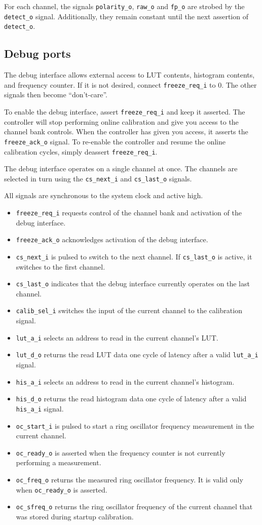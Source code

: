 \documentclass[a4paper,11pt]{article}
\begin{document}
For each channel, the signals \verb!polarity_o!, \verb!raw_o! and \verb!fp_o! are strobed by the \verb!detect_o! signal. Additionally, they remain constant until the next assertion of \verb!detect_o!.

\subsection{Debug ports}
The debug interface allows external access to LUT contents, histogram contents, and frequency counter. If it is not desired, connect \verb!freeze_req_i! to 0. The other signals then become ``don't-care''.

To enable the debug interface, assert \verb!freeze_req_i! and keep it asserted. The controller will stop performing online calibration and give you access to the channel bank controls. When the controller has given you access, it asserts the \verb!freeze_ack_o! signal. To re-enable the controller and resume the online calibration cycles, simply deassert \verb!freeze_req_i!.

The debug interface operates on a single channel at once. The channels are selected in turn using the \verb!cs_next_i! and \verb!cs_last_o! signals.

All signals are synchronous to the system clock and active high.
\begin{itemize}
\item \verb!freeze_req_i! requests control of the channel bank and activation of the debug interface.
\item \verb!freeze_ack_o! acknowledges activation of the debug interface.
\item \verb!cs_next_i! is pulsed to switch to the next channel. If \verb!cs_last_o! is active, it switches to the first channel.
\item \verb!cs_last_o! indicates that the debug interface currently operates on the last channel.
\item \verb!calib_sel_i! switches the input of the current channel to the calibration signal.
\item \verb!lut_a_i! selects an address to read in the current channel's LUT.
\item \verb!lut_d_o! returns the read LUT data one cycle of latency after a valid \verb!lut_a_i! signal.
\item \verb!his_a_i! selects an address to read in the current channel's histogram.
\item \verb!his_d_o! returns the read histogram data one cycle of latency after a valid \verb!his_a_i! signal.
\item \verb!oc_start_i! is pulsed to start a ring oscillator frequency measurement in the current channel.
\item \verb!oc_ready_o! is asserted when the frequency counter is not currently performing a measurement.
\item \verb!oc_freq_o! returns the measured ring oscillator frequency. It is valid only when \verb!oc_ready_o! is asserted.
\item \verb!oc_sfreq_o! returns the ring oscillator frequency of the current channel that was stored during startup calibration.
\end{itemize}
\end{document}
